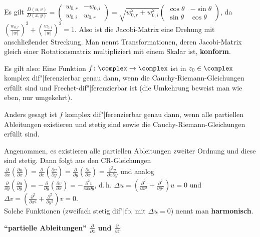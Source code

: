Es gilt $\frac{D(u, v)}{D(x, y)} =
\begin{pmatrix}w_{0,r} & -w_{0,i}\\w_{0,i} & w_{0,r}\end{pmatrix} =
\sqrt{w_{0,r}^2 + w_{0,i}^2}
\begin{pmatrix}\cos \theta & -\sin \theta\\
\sin \theta & \cos \theta\end{pmatrix}$,
da $\left(\frac{w_{0,r}}{|w|}\right)^2 +
\left(\frac{w_{0,i}}{|w|}\right)^2 = 1$.
Also ist die Jacobi-Matrix eine Drehung mit anschließender Streckung.
Man nennt Transformationen, deren Jacobi-Matrix gleich einer Rotationsmatrix
multipliziert mit einem Skalar ist, \textbf{konform}.

Es gilt also:
Eine Funktion $f\colon \complex \rightarrow \complex$ ist in
$z_0 \in \complex$ komplex dif"|ferenzierbar genau dann, wenn die
Cauchy-Riemann-Gleichungen erfüllt sind und
 Frechet-dif"|ferenzierbar ist
(die Umkehrung beweist man wie eben, nur umgekehrt).

Anders gesagt ist $f$ komplex dif"|ferenzierbar genau dann, wenn alle
partiellen Ableitungen existieren und stetig sind sowie die
Cauchy-Riemann-Gleichungen erfüllt sind.

\linie

Angenommen, es existieren alle partiellen Ableitungen zweiter Ordnung und
diese sind stetig.
Dann folgt aus den CR-Gleichungen
$\frac{\partial}{\partial x} \left(\frac{\partial u}{\partial x}\right) =
\frac{\partial}{\partial x} \left(\frac{\partial v}{\partial y}\right) =
\frac{\partial}{\partial y} \left(\frac{\partial v}{\partial x}\right) =
\frac{\partial^2 v}{\partial x \partial y}$ und analog\\
$\frac{\partial}{\partial y} \left(\frac{\partial u}{\partial y}\right) =
-\frac{\partial}{\partial y} \left(\frac{\partial v}{\partial x}\right) =
-\frac{\partial^2 v}{\partial x \partial y}$, d.\,h.
$\Delta u = \left(\frac{\partial^2}{\partial x^2} +
\frac{\partial^2}{\partial y^2}\right)u = 0$ und
$\Delta v = \left(\frac{\partial^2}{\partial x^2} +
\frac{\partial^2}{\partial y^2}\right)v = 0$.\\
Solche Funktionen (zweifach stetig dif"|fb. mit $\Delta u = 0$)
nennt man \textbf{harmonisch}.

\linie
\pagebreak

\textbf{"`partielle Ableitungen"' $\frac{\partial}{\partial z}$ und
$\frac{\partial}{\partial \overline{z}}$}:


